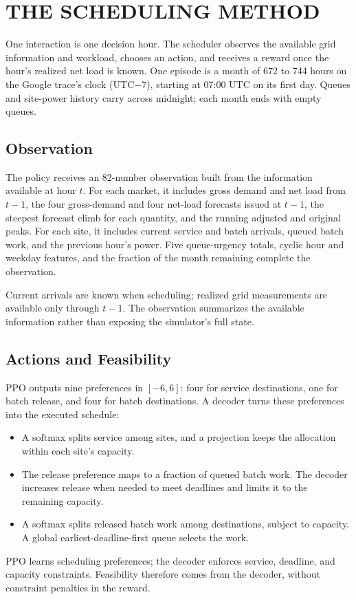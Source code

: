 \documentclass{UNCC-thesis}
\begin{document}
\chapter{THE SCHEDULING METHOD}
\label{sec:scheduler}

One interaction is one decision hour. The scheduler observes the available
grid information and workload, chooses an action, and receives a reward
once the hour's realized net load is known. One episode is a month of 672 to
744 hours on the Google trace's clock (UTC\(-7\)), starting at 07:00 UTC on
its first day. Queues and site-power history carry across midnight;
each month ends with empty queues.

\section{Observation}
\label{subsec:observation}

The policy receives an 82-number observation built from the information
available at hour \(t\). For each market, it includes gross demand and net
load from \(t-1\), the four gross-demand and four net-load forecasts issued
at \(t-1\), the steepest forecast climb for each quantity, and the running
adjusted and original peaks. For each site, it includes current service and
batch arrivals, queued batch work, and the previous hour's power. Five
queue-urgency totals, cyclic hour and weekday features, and the fraction of
the month remaining complete the observation.

Current arrivals are known when scheduling; realized grid measurements are
available only through \(t-1\). The observation summarizes the available
information rather than exposing the simulator's full state.

\section{Actions and Feasibility}
\label{subsec:actions}

PPO outputs nine preferences in \([-6,6]\): four for service destinations,
one for batch release, and four for batch destinations. A decoder turns
these preferences into the executed schedule:
\begin{itemize}
  \item A softmax splits service among sites, and a projection keeps the
        allocation within each site's capacity.
  \item The release preference maps to a fraction of queued batch work.
        The decoder increases release when needed to meet deadlines and
        limits it to the remaining capacity.
  \item A softmax splits released batch work among destinations, subject to
        capacity. A global earliest-deadline-first queue selects the work.
\end{itemize}
PPO learns scheduling preferences; the decoder enforces service, deadline,
and capacity constraints. Feasibility therefore comes from the decoder,
without constraint penalties in the reward.
\end{document}
